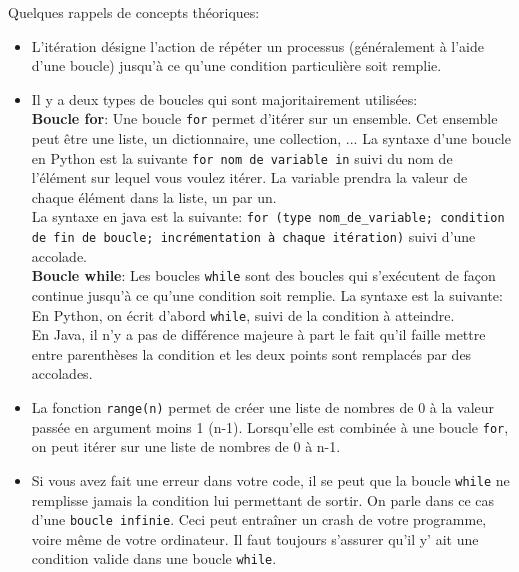     Quelques rappels de concepts théoriques: \\
    
    \begin{itemize}
    	\item L'itération désigne l'action de répéter un processus (généralement à l'aide d'une boucle) jusqu'à ce qu'une condition particulière soit remplie.
    	\item Il y a deux types de boucles qui sont majoritairement utilisées: \\
    	
    	\textbf{Boucle for}: Une boucle \lstinline{for} permet d'itérer sur un ensemble. Cet ensemble peut être une liste, un dictionnaire, une collection, ... La syntaxe d'une boucle en Python est la suivante \lstinline{for nom de variable in} suivi du nom de l'élément sur lequel vous voulez itérer. La variable prendra la valeur de chaque élément dans la liste, un par un. \\
    	
    	
             	
     	La syntaxe en java est la suivante: \lstinline{for (type nom_de_variable; condition de fin de boucle; incrémentation à chaque itération)} suivi d'une accolade. \\
     	
        	 
        \textbf{Boucle while}: Les boucles \lstinline{while} sont des boucles qui s’exécutent de façon continue jusqu’à ce qu’une condition soit remplie. La syntaxe est la suivante: En Python, on écrit d’abord \lstinline{while}, suivi de la condition à atteindre.\\
     	
     	En Java, il n'y a pas de différence majeure à part le fait qu'il faille mettre entre parenthèses la condition et les deux points sont remplacés par des accolades. \\
     	
     	
     	\item La fonction \lstinline{range(n)} permet de créer une liste de nombres de 0 à la valeur passée en argument moins 1 (n-1). Lorsqu’elle est combinée à une boucle \lstinline{for}, on peut itérer sur une liste de nombres de 0 à n-1. \\
     	
     	\item Si vous avez fait une erreur dans votre code, il se peut que la boucle \lstinline{while} ne remplisse jamais la condition lui permettant de sortir. On parle dans ce cas d'une \lstinline{boucle infinie}. Ceci peut entraîner un crash de votre programme, voire même de votre ordinateur. Il faut toujours s'assurer qu'il y' ait une condition valide dans une boucle \lstinline{while}. \\
     	
     	\end{itemize}
     	
